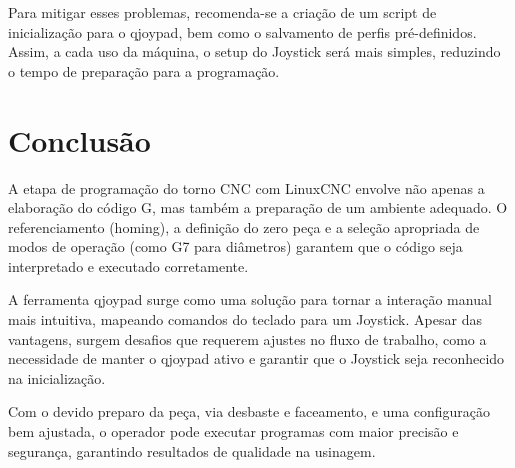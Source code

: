 Para mitigar esses problemas, recomenda-se a criação de um script de inicialização para o qjoypad, bem como o salvamento de perfis pré-definidos. Assim, a cada uso da máquina, o setup do Joystick será mais simples, reduzindo o tempo de preparação para a programação.

\section{Conclusão}

A etapa de programação do torno CNC com LinuxCNC envolve não apenas a elaboração do código G, mas também a preparação de um ambiente adequado. O referenciamento (homing), a definição do zero peça e a seleção apropriada de modos de operação (como G7 para diâmetros) garantem que o código seja interpretado e executado corretamente.

A ferramenta qjoypad surge como uma solução para tornar a interação manual mais intuitiva, mapeando comandos do teclado para um Joystick. Apesar das vantagens, surgem desafios que requerem ajustes no fluxo de trabalho, como a necessidade de manter o qjoypad ativo e garantir que o Joystick seja reconhecido na inicialização.

Com o devido preparo da peça, via desbaste e faceamento, e uma configuração bem ajustada, o operador pode executar programas com maior precisão e segurança, garantindo resultados de qualidade na usinagem.

